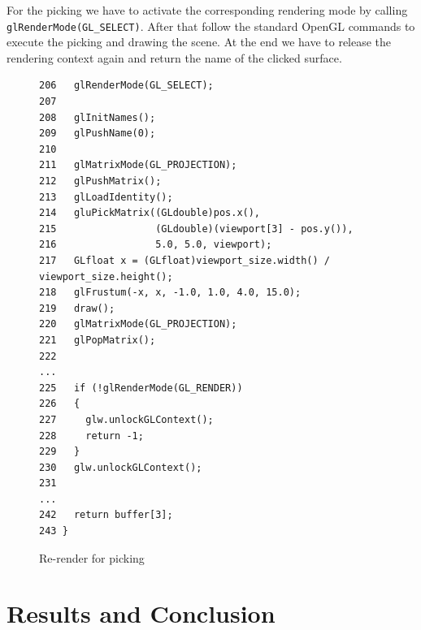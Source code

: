 \documentclass[jou,noapacite]{apa}
\renewcommand{\figurename}{Listing}
\begin{document}
For the picking we have to activate the corresponding rendering mode by
calling \lstinline|glRenderMode(GL_SELECT)|.
%
After that follow the standard OpenGL commands to execute the picking and
drawing the scene.
%
At the end we have to release the rendering context again and return the name
of the clicked surface.
%
\begin{figure}[h]
\begin{lstlisting}[basicstyle=\scriptsize]
206   glRenderMode(GL_SELECT);
207
208   glInitNames();
209   glPushName(0);
210
211   glMatrixMode(GL_PROJECTION);
212   glPushMatrix();
213   glLoadIdentity();
214   gluPickMatrix((GLdouble)pos.x(),
215                 (GLdouble)(viewport[3] - pos.y()),
216                 5.0, 5.0, viewport);
217   GLfloat x = (GLfloat)viewport_size.width() /               viewport_size.height();
218   glFrustum(-x, x, -1.0, 1.0, 4.0, 15.0);
219   draw();
220   glMatrixMode(GL_PROJECTION);
221   glPopMatrix();
222
...
225   if (!glRenderMode(GL_RENDER))
226   {
227     glw.unlockGLContext();
228     return -1;
229   }
230   glw.unlockGLContext();
231
...
242   return buffer[3];
243 }
\end{lstlisting}
\caption{Re-render for picking}
\end{figure}

\section{Results and Conclusion}

\renewcommand{\figurename}{Figure}
\setcounter{figure}{0}
\end{document}
